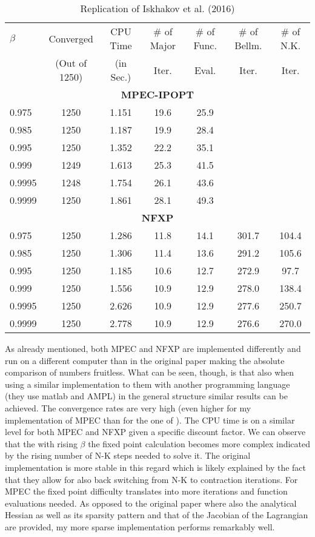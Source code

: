 \begin{table}[H]
	\centering
	\caption{Replication of Iskhakov et al. (2016)}
	\label{table1}
	\begin{tabular}{l c c c c c c}
		\toprule\midrule
		$\beta$ & Converged  & CPU Time & \# of Major & \# of Func. & \# of Bellm. & \# of N.K.   \\
		& (Out of 1250) & (in Sec.) & Iter. & Eval. & Iter. & Iter. \\
		\midrule
		\multicolumn{7}{c}{\textbf{MPEC-IPOPT}} \\
		0.975 & 1250 & 1.151 & 19.6 & 25.9 \\
		0.985 & 1250 & 1.187 & 19.9 & 28.4 \\
		0.995 & 1250 & 1.352 & 22.2 & 35.1 \\
		0.999 & 1249 & 1.613 & 25.3 & 41.5 \\
		0.9995 & 1248 & 1.754 & 26.1 & 43.6 \\
		0.9999 & 1250 & 1.861 & 28.1 & 49.3 \\
		\multicolumn{7}{c}{\textbf{NFXP}} \\
		0.975 & 1250 & 1.286 & 11.8 & 14.1 & 301.7 & 104.4 \\
		0.985 & 1250 & 1.306 & 11.4 & 13.6 & 291.2 & 105.6 \\
		0.995 & 1250 & 1.185 & 10.6 & 12.7 & 272.9 & 97.7 \\
		0.999 & 1250  & 1.556 & 10.9 & 12.9 & 278.0 & 138.4 \\
		0.9995 & 1250 & 2.626 & 10.9 & 12.9 & 277.6 & 250.7 \\
		0.9999 & 1250 & 2.778 & 10.9 & 12.9 & 276.6 & 270.0 \\ 
		\bottomrule
	\end{tabular}
\end{table}

As already mentioned, both MPEC and NFXP are implemented differently and run on a different computer than in the original paper making the absolute comparison of numbers fruitless. What can be seen, though, is that also when using a similar implementation to them with another programming language (they use matlab and AMPL) in the general structure similar results can be achieved. The convergence rates are very high (even higher for my implementation of MPEC than for the one of \citeauthor{Iskhakov.2016}). The CPU time is on a similar level for both MPEC and NFXP given a specific discount factor. We can observe that the with rising $\beta$ the fixed point calculation becomes more complex indicated by the rising number of N-K steps needed to solve it. The original implementation is more stable in this regard which is likely explained by the fact that they allow for also back switching from N-K to contraction iterations. For MPEC the fixed point difficulty translates into more iterations and function evaluations needed. As opposed to the original paper where also the analytical Hessian as well as its sparsity pattern and that of the Jacobian of the Lagrangian are provided, my more sparse implementation performs remarkably well. 


